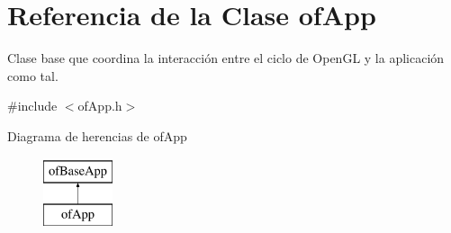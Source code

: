 \hypertarget{classof_app}{}\section{Referencia de la Clase of\+App}
\label{classof_app}


Clase base que coordina la interacción entre el ciclo de Open\+G\+L y la aplicación como tal.  




{\ttfamily \#include $<$of\+App.\+h$>$}

Diagrama de herencias de of\+App\begin{figure}[H]
\begin{center}
\leavevmode
\includegraphics[height=2.000000cm]{classof_app}
\end{center}
\end{figure}
